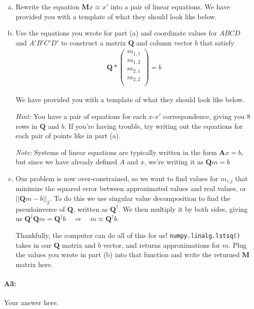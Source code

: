 \begin{enumerate}[(a)]
\item Rewrite the equation $\boldsymbol{M}x \approx x'$ into a pair of linear equations. We have provided you with a template of what they should look like below.

\item Use the equations you wrote for part (a) and coordinate values for $ABCD$ and $A'B'C'D'$ to construct a matrix $\boldsymbol{Q}$ and column vector $b$ that satisfy
\begin{align}
    \boldsymbol{Q}*\begin{pmatrix} m_{1,1} \\ m_{1,2} \\ m_{2,1} \\ m_{2,2} \\ \end{pmatrix} = b
\end{align}

We have provided you with a template of what they should look like below.

\emph{Hint:} You have a pair of equations for each $x$-$x'$ correspondence, giving you $8$ rows in $\boldsymbol{Q}$ and $b$. If you're having trouble, try writing out the equations for each pair of points like in part (a).

\emph{Note:} Systems of linear equations are typically written in the form $\boldsymbol{A}x=b$, but since we have already defined $A$ and $x$, we're writing it as $\boldsymbol{Q}m=b$

\item Our problem is now over-constrained, so we want to find values for $m_{i,j}$ that minimize the squared error between approximated values and real values, or $||\boldsymbol{Q}m-b||_2$. To do this we use singular value decomposition to find the pseudoinverse of $\boldsymbol{Q}$, written as $\boldsymbol{Q}^\dagger$. We then multiply it by both sides, giving us $\boldsymbol{Q}^\dagger \boldsymbol{Q}m = \boldsymbol{Q}^\dagger b \quad\Rightarrow\quad m \approx \boldsymbol{Q}^\dagger b$.

Thankfully, the computer can do all of this for us! \texttt{numpy.linalg.lstsq()} takes in our $\boldsymbol{Q}$ matrix and $b$ vector, and returns approximations for $m$. Plug the values you wrote in part (b) into that function and write the returned $\boldsymbol{M}$ matrix here.
\end{enumerate}

\paragraph{A3:} Your answer here.

